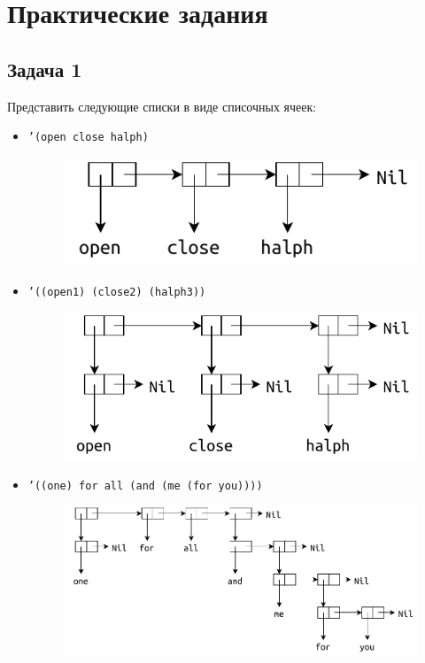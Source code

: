 \chapter{Практические задания}

\section{Задача 1}

Представить следующие списки в виде списочных ячеек:

\begin{itemize}[$\bullet$]
	\item \texttt{'(open close halph)}
	
	\begin{figure}[ht]
		\centering
		\includegraphics[scale=1]{img/1-1}
	\end{figure}
	
	\item \texttt{'((open1) (close2) (halph3))}
	
	\begin{figure}[ht]
		\centering
		\includegraphics[scale=1]{img/1-2}
	\end{figure}
	
	\item \texttt{'((one) for all (and (me (for you))))}
	
	\begin{figure}[ht]
		\centering
		\includegraphics[scale=1]{img/1-3}
	\end{figure}


\end{itemize}

